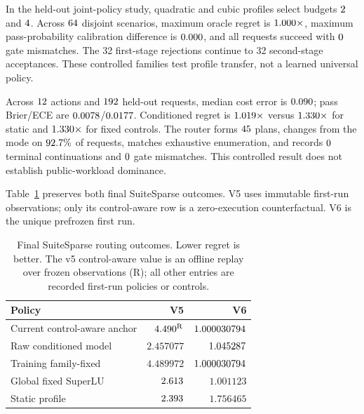 In the held-out joint-policy study, quadratic and cubic profiles select budgets
$2$ and $4$. Across
$64$ disjoint scenarios, maximum oracle regret is
$1.000\times$, maximum pass-probability calibration difference is
$0.000$, and all requests succeed with
$0$ gate mismatches. The 32 first-stage rejections continue to
32 second-stage acceptances. These controlled families test profile transfer, not a
learned universal policy.

Across $12$ actions and $192$ held-out
requests, median cost error is $0.090$; pass Brier/ECE are
$0.0078$/$0.0177$. Conditioned regret is
$1.019\times$ versus $1.330\times$ for static and
$1.330\times$ for fixed controls. The router forms
$45$ plans, changes from the mode on
$92.7\%$ of requests, matches exhaustive enumeration, and
records $0$ terminal continuations and $0$ gate
mismatches. This controlled result does not establish public-workload dominance.

Table~\ref{tab:suitesparse-final-routing} preserves both final SuiteSparse outcomes.
V5 uses immutable first-run observations; only its control-aware row is a
zero-execution counterfactual. V6 is the unique prefrozen first run.

\begin{table}[t]
\centering
\scriptsize
\caption{Final SuiteSparse routing outcomes. Lower regret is better. The v5
control-aware value is an offline replay over frozen observations (R); all other
entries are recorded first-run policies or controls.}
\label{tab:suitesparse-final-routing}
\begin{tabular}{lrr}
\toprule
Policy & V5 & V6 \\
\midrule
Current control-aware anchor & $4.490^{\mathrm{R}}$ & $1.000030794$ \\
Raw conditioned model & $2.457077$ & $1.045287$ \\
Training family-fixed & $4.489972$ & $1.000030794$ \\
Global fixed SuperLU & $2.613$ & $1.001123$ \\
Static profile & $2.393$ & $1.756465$ \\
\bottomrule
\end{tabular}
\end{table}

